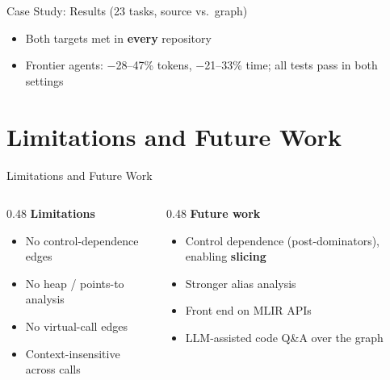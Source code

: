 \documentclass[aspectratio=169,10pt]{beamer}
\begin{document}
\begin{frame}{Case Study: Results (23 tasks, source vs.\ graph)}
  \vspace{1em}
  \begin{itemize}
    \item Both targets met in \textbf{every} repository
    \item Frontier agents: $-$28--47\% tokens, $-$21--33\% time; all tests pass in both settings
  \end{itemize}
\end{frame}

\section{Limitations and Future Work}

\begin{frame}{Limitations and Future Work}
  \begin{columns}[T]
    \begin{column}{0.48\textwidth}
      \textbf{Limitations}
      \begin{itemize}
        \item No control-dependence edges
        \item No heap / points-to analysis
        \item No virtual-call edges
        \item Context-insensitive across calls
      \end{itemize}
    \end{column}
    \begin{column}{0.48\textwidth}
      \textbf{Future work}
      \begin{itemize}
        \item Control dependence (post-dominators), enabling \textbf{slicing}
        \item Stronger alias analysis
        \item Front end on MLIR APIs
        \item LLM-assisted code Q\&A over the graph
      \end{itemize}
    \end{column}
  \end{columns}
\end{frame}
\end{document}
